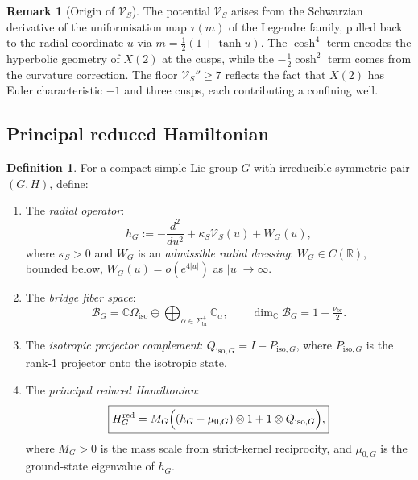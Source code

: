 \documentclass[12pt]{article}
\theoremstyle{plain}
\theoremstyle{definition}
\newtheorem{definition}[theorem]{Definition}
\newtheorem{remark}[theorem]{Remark}
\numberwithin{equation}{section}
\newcommand{\R}{\mathbb{R}}
\newcommand{\C}{\mathbb{C}}
\newcommand{\red}{\mathrm{red}}
\newcommand{\br}{\mathrm{br}}
\newcommand{\iso}{\mathrm{iso}}
\begin{document}
\begin{remark}[Origin of $\mathcal{V}_S$]
The potential $\mathcal{V}_S$ arises from the Schwarzian derivative of the uniformisation map $\tau(m)$ of the Legendre family, pulled back to the radial coordinate $u$ via $m=\frac{1}{2}(1+\tanh u)$.  The $\cosh^4$ term encodes the hyperbolic geometry of $X(2)$ at the cusps, while the $-\frac{1}{2}\cosh^2$ term comes from the curvature correction.  The floor $\mathcal{V}_S''\geq 7$ reflects the fact that $X(2)$ has Euler characteristic $-1$ and three cusps, each contributing a confining well.
\end{remark}

\subsection{Principal reduced Hamiltonian}

\begin{definition}\label{def:reducedHam}
For a compact simple Lie group $G$ with irreducible symmetric pair $(G,H)$, define:
\begin{enumerate}[label=(\roman*)]
\item The \emph{radial operator}:
\begin{equation}
h_G := -\frac{d^2}{du^2} + \kappa_S\mathcal{V}_S(u) + W_G(u),
\end{equation}
where $\kappa_S>0$ and $W_G$ is an \emph{admissible radial dressing}: $W_G\in C(\R)$, bounded below, $W_G(u)=o(e^{4|u|})$ as $|u|\to\infty$.

\item The \emph{bridge fiber space}:
\begin{equation}
\mathcal{B}_G = \C\Omega_{\iso}\oplus\bigoplus_{\alpha\in\Sigma_{\br}^+}\C_\alpha,
\qquad \dim_\C\mathcal{B}_G = 1+\tfrac{\nu_{\br}}{2}.
\end{equation}

\item The \emph{isotropic projector complement}: $Q_{\iso,G}=I-P_{\iso,G}$, where $P_{\iso,G}$ is the rank-1 projector onto the isotropic state.

\item The \emph{principal reduced Hamiltonian}:
\begin{equation}
\boxed{H_G^{\red} = M_G\Bigl((h_G-\mu_{0,G})\otimes 1 + 1\otimes Q_{\iso,G}\Bigr),}
\end{equation}
where $M_G>0$ is the mass scale from strict-kernel reciprocity, and $\mu_{0,G}$ is the ground-state eigenvalue of $h_G$.
\end{enumerate}
\end{definition}
\end{document}
